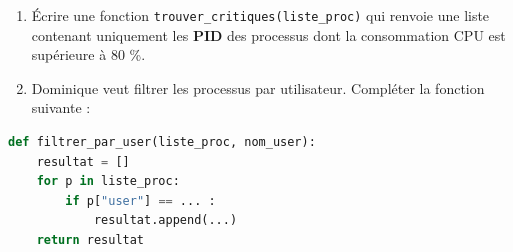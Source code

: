 \begin{Exercise}[title={Systèmes d'exploitation, gestion des fichiers et des processus}]
\begin{enumerate}
    \item Écrire une fonction \texttt{trouver\_critiques(liste\_proc)} qui renvoie une liste contenant uniquement les \textbf{PID} des processus dont la consommation CPU est supérieure à 80 \%.
    \item Dominique veut filtrer les processus par utilisateur. Compléter la fonction suivante :
\end{enumerate}

\begin{lstlisting}[language=Python]
def filtrer_par_user(liste_proc, nom_user):
    resultat = []
    for p in liste_proc:
        if p["user"] == ... :
            resultat.append(...)
    return resultat
\end{lstlisting}


\end{Exercise}